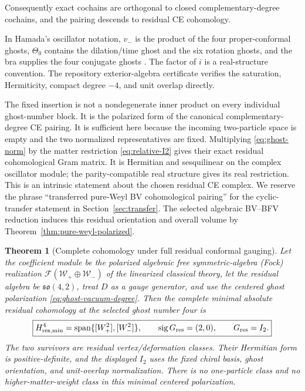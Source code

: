 \documentclass[11pt]{article}
\newtheorem{theorem}{Theorem}[section]
\theoremstyle{definition}
\theoremstyle{remark}
\newcommand{\W}{\mathcal W}
\newcommand{\F}{\mathcal F}
\begin{document}
Consequently exact cochains are orthogonal to closed complementary-degree
cochains, and the pairing descends to residual CE cohomology.

In Hamada's oscillator notation, $v_-$ is the product of the four
proper-conformal ghosts, $\Theta_0$ contains the dilation/time ghost and the
six rotation ghosts, and the bra supplies the four conjugate ghosts
\cite{HamadaBRST}.  The factor of $i$ is a real-structure convention.  The
repository exterior-algebra certificate verifies the saturation,
Hermiticity, compact degree $-4$, and unit overlap directly.

The fixed insertion is not a nondegenerate inner product on every individual
ghost-number block.  It is the polarized form of the canonical
complementary-degree CE pairing.  It is sufficient here because the incoming
two-particle space is empty and the two normalized representatives are
fixed.  Multiplying \eqref{eq:ghost-norm} by the matter restriction
\eqref{eq:relative-I2} gives their exact residual cohomological Gram matrix.
It is Hermitian and sesquilinear on the complex oscillator module; the
parity-compatible real structure gives its real restriction.  This is an
intrinsic statement about the chosen residual CE complex.  We reserve the
phrase ``transferred pure-Weyl BV cohomological pairing'' for the
cyclic-transfer statement in Section~\ref{sec:transfer}.  The selected
algebraic BV--BFV reduction induces this residual orientation and overall
volume by Theorem~\ref{thm:pure-weyl-polarized}.

\begin{theorem}[Complete cohomology under full residual conformal gauging]\label{thm:residual-main}
Let the coefficient module be the polarized algebraic free
symmetric-algebra (Fock) realization $\F(\W_+\oplus\W_-)$ of the
linearized classical theory, let the residual algebra be
$\mathfrak{so}(4,2)$, treat $D$ as a gauge generator, and use the centered
ghost polarization \eqref{eq:ghost-vacuum-degree}.  Then the complete
minimal absolute residual cohomology at the selected ghost number four is
\begin{equation}\label{eq:main-result}
 \boxed{
 H^4_{\rm res,min}
 =\operatorname{span}\{[W_+^2],[W_-^2]\},
 \qquad \operatorname{sig}G_{\rm res}=(2,0),
 \qquad G_{\rm res}=I_2.}
\end{equation}
The two survivors are residual vertex/deformation classes.  Their Hermitian
form is positive-definite, and the displayed $I_2$ uses the fixed chiral
basis, ghost orientation, and unit-overlap normalization.  There is no
one-particle class and no higher-matter-weight class in this minimal centered
polarization.
\end{theorem}
\end{document}
